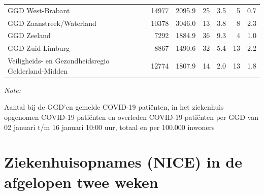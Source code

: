 \documentclass[
  english,
  man,floatsintext]{apa6}
\begin{document}
\begin{table}
\begin{threeparttable}
\begin{tabular}{lrrrrrr}
GGD West-Brabant & 14977 & 2095.9 & 25 & 3.5 & 5 & 0.7\\
GGD Zaanstreek/Waterland & 10378 & 3046.0 & 13 & 3.8 & 8 & 2.3\\
GGD Zeeland & 7292 & 1884.9 & 36 & 9.3 & 4 & 1.0\\
GGD Zuid-Limburg & 8867 & 1490.6 & 32 & 5.4 & 13 & 2.2\\
Veiligheids- en Gezondheidsregio Gelderland-Midden & 12774 & 1807.9 & 14 & 2.0 & 13 & 1.8\\
\bottomrule
\end{tabular}
\begin{tablenotes}
\item \textit{Note: } 
\item Aantal bij de GGD’en gemelde COVID-19 patiënten, in het ziekenhuis opgenomen COVID-19 patiënten en overleden COVID-19 patiënten per GGD van 02 januari t/m 16 januari 10:00 uur, totaal en per 100.000 inwoners
\end{tablenotes}
\end{threeparttable}
\endgroup{}
\end{table}

\newpage

\hypertarget{ziekenhuisopnames-nice-in-de-afgelopen-twee-weken}{%
\section{Ziekenhuisopnames (NICE) in de afgelopen twee weken}\label{ziekenhuisopnames-nice-in-de-afgelopen-twee-weken}}
\end{document}

